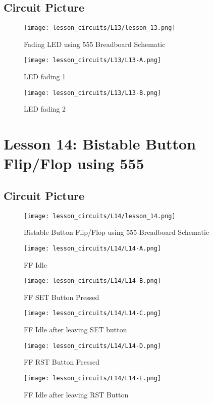 \subsection{Circuit Picture}
\begin{figure}[htp]
    \centering
    \texttt{[image: lesson\_circuits/L13/lesson\_13.png]}
    \caption{Fading LED using 555 Breadboard Schematic}
    \label{fig:555_fled_sch}
\end{figure}
\begin{figure}[htp]
    \centering
    \texttt{[image: lesson\_circuits/L13/L13-A.png]}
    \caption{LED fading 1}
    \label{fig:555_fled_obb}
\end{figure}
\begin{figure}[htp]
    \centering
    \texttt{[image: lesson\_circuits/L13/L13-B.png]}
    \caption{LED fading 2}
    \label{fig:555_fled_obb1}
\end{figure}

\section{Lesson 14: Bistable Button Flip/Flop using 555}
\subsection{Circuit Picture}
\begin{figure}[htp]
    \centering
    \texttt{[image: lesson\_circuits/L14/lesson\_14.png]}
    \caption{Bistable Button Flip/Flop using 555 Breadboard Schematic}
    \label{fig:555_ff_sch}
\end{figure}
\begin{figure}[htp]
    \centering
    \texttt{[image: lesson\_circuits/L14/L14-A.png]}
    \caption{FF Idle}
    \label{fig:555_ff_obb}
\end{figure}
\begin{figure}[htp]
    \centering
    \texttt{[image: lesson\_circuits/L14/L14-B.png]}
    \caption{FF SET Button Pressed}
    \label{fig:555_ff_obb1}
\end{figure}
\begin{figure}[htp]
    \centering
    \texttt{[image: lesson\_circuits/L14/L14-C.png]}
    \caption{FF Idle after leaving SET button}
    \label{fig:555_ff_obb2}
\end{figure}
\begin{figure}[htp]
    \centering
    \texttt{[image: lesson\_circuits/L14/L14-D.png]}
    \caption{FF RST Button Pressed}
    \label{fig:555_ff_obb3}
\end{figure}
\begin{figure}[htp]
    \centering
    \texttt{[image: lesson\_circuits/L14/L14-E.png]}
    \caption{FF Idle after leaving RST Button}
    \label{fig:555_ff_obb4}
\end{figure}
